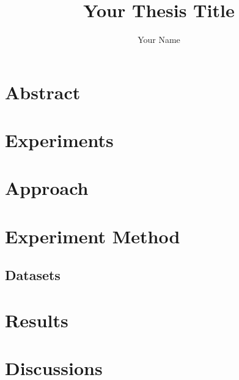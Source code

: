 \documentclass[10pt,a4j,twocolumn]{jsarticle}
\title{Your Thesis Title}
\author{Your Name}
\begin{document}
\setlength{\abovedisplayskip}{0pt}
\setlength{\belowdisplayskip}{0pt}
\renewcommand{\baselinestretch}{0.9}
\maketitle

\section{Abstract}

\section{Experiments}

\section{Approach}

\section{Experiment Method}

\subsection{Datasets}

\section{Results}

\section{Discussions}

\small


\end{document}
